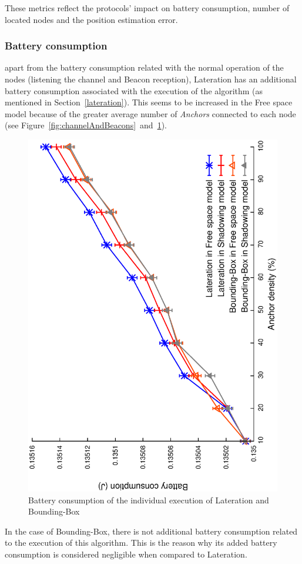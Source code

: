 These metrics reflect the protocols' impact on battery consumption, number of located nodes and the position estimation error.

\subsubsection{Battery consumption}\label{individual_battery_consumption}
apart from the battery consumption related with the normal operation of the nodes (listening the channel and Beacon reception), Lateration has an additional battery consumption associated with the execution of the algorithm (as mentioned in Section~\ref{lateration}). This seems to be increased in the Free space model because of the greater average number of \emph{Anchors} connected to each node (see Figure~\ref{fig:channelAndBeacons}~and~\ref{fig:battery}).

\begin{figure}[tb]
  \centering
  \includegraphics[width=0.7\linewidth, angle = -90]{section4/figures/battery.eps}
  \caption{Battery consumption of the individual execution of Lateration and Bounding-Box
  \label{fig:battery}}
\end{figure}

In the case of Bounding-Box, there is not additional battery consumption related to the execution of this algorithm. This is the reason why its added battery consumption is considered negligible when compared to Lateration.

